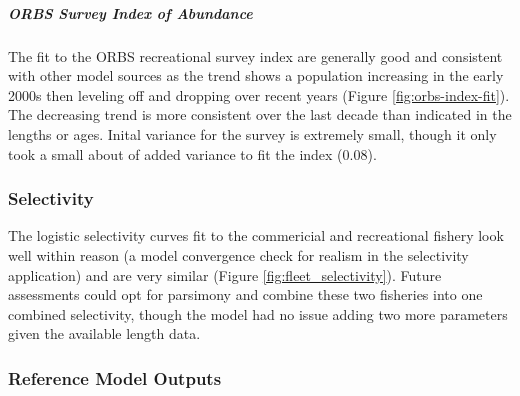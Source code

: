 \documentclass[11pt,
  english,
  a4paper,
]{article}
\begin{document}

\hypertarget{orbs-survey-index-of-abundance}{%
\subparagraph{ORBS Survey Index of Abundance}\label{orbs-survey-index-of-abundance}}

\leavevmode\tagmcend\tagstructend


The fit to the ORBS recreational survey index are generally good and consistent with other model sources as the trend shows a population increasing in the early 2000s then leveling off and dropping over recent years (Figure \ref{fig:orbs-index-fit}). The decreasing trend is more consistent over the last decade than indicated in the lengths or ages. Inital variance for the survey is extremely small, though it only took a small about of added variance to fit the index (0.08).

\leavevmode\tagmcend\tagstructend\par


\hypertarget{selectivity}{%
\subsubsection{Selectivity}\label{selectivity}}

\leavevmode\tagmcend\tagstructend


The logistic selectivity curves fit to the commericial and recreational fishery look well within reason (a model convergence check for realism in the selectivity application) and are very similar (Figure \ref{fig:fleet_selectivity}). Future assessments could opt for parsimony and combine these two fisheries into one combined selectivity, though the model had no issue adding two more parameters given the available length data.

\leavevmode\tagmcend\tagstructend\par


\hypertarget{reference-model-outputs}{%
\subsubsection{Reference Model Outputs}\label{reference-model-outputs}}

\leavevmode\tagmcend\tagstructend
\end{document}
